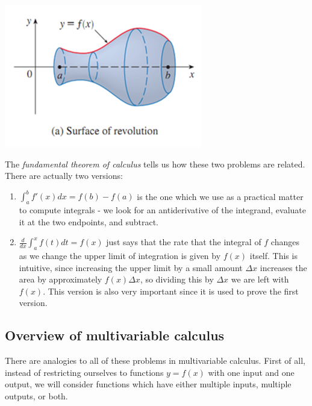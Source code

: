 \documentclass[12pt,letterpaper,reqno]{article}
\numberwithin{equation}{section}
\newcommand{\ti}[1]{\textit{#1}}
\begin{document}
\begin{center}
	\includegraphics[scale=0.5]{figures_mvc/surface_of_revolution}
\end{center}


The \ti{fundamental theorem of calculus} tells us how these two problems are related. There are actually two versions:
\begin{enumerate}
	\item $\int_a^b f'(x)dx=f(b)-f(a)$ is the one which we use as a practical matter to compute integrals - we look for an antiderivative of the integrand, evaluate it at the two endpoints, and subtract.
	\item $\frac{d}{dx}\int_a^xf(t)dt=f(x)$ just says that the rate that the integral of $f$ changes as we change the upper limit of integration is given by $f(x)$ itself. This is intuitive, since increasing the upper limit by a small amount $\Delta x$ increases the area by approximately $f(x)\Delta x$, so dividing this by $\Delta x$ we are left with $f(x)$. This version is also very important since it is used to prove the first version.
\end{enumerate}

\subsection{Overview of multivariable calculus}
There are analogies to all of these problems in multivariable calculus. First of all, instead of restricting ourselves to functions $y=f(x)$ with one input and one output, we will consider functions which have either multiple inputs, multiple outputs, or both. 
\end{document}
